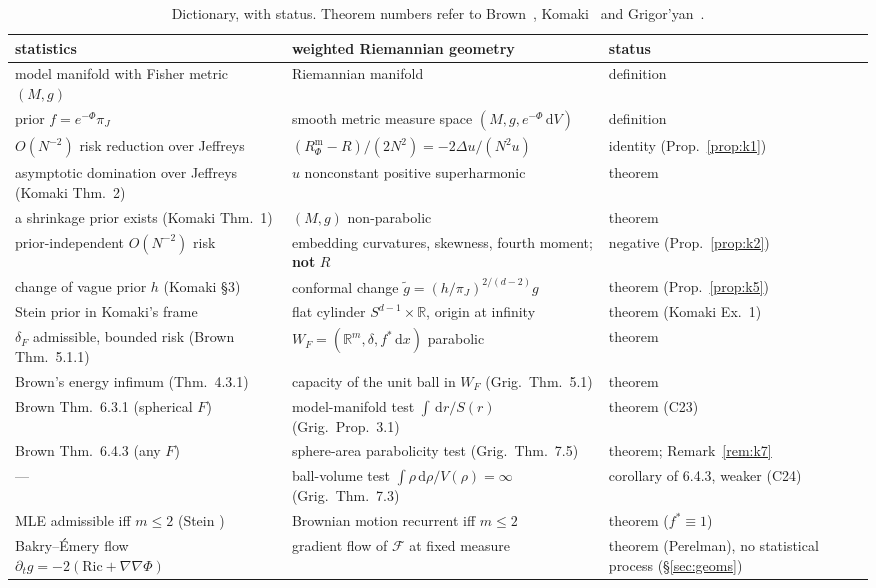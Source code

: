 \documentclass[a4paper,11pt,noarxiv]{quantumarticle}
\newcommand{\R}{\mathbb{R}}
\newcommand{\Rm}{R^{\mathrm m}}
\newcommand{\dd}{\,\mathrm{d}}
\newcommand{\grad}{\nabla}
\theoremstyle{plain}
\theoremstyle{definition}
\theoremstyle{remark}
\begin{document}
\begin{table}[t]
\caption{Dictionary, with status. Theorem numbers refer to
Brown~\cite{brown1971}, Komaki~\cite{komaki2006} and
Grigor'yan~\cite{grigoryan1999}.}
\label{tab:dict}
\small
\begin{tabular}{@{}>{\raggedright\arraybackslash}p{}>{\raggedright\arraybackslash}p{}>{\raggedright\arraybackslash}p{}@{}}
\toprule
statistics & weighted Riemannian geometry & status \\
\midrule
model manifold with Fisher metric $(M,g)$ & Riemannian manifold & definition \cite{amari2000} \\
prior $f=e^{-\Phi}\pi_J$ & smooth metric measure space $(M,g,e^{-\Phi}\dd V)$ & definition \\
$O(N^{-2})$ risk reduction over Jeffreys & $(\Rm_\Phi-R)/(2N^2)=-2\Delta u/(N^2u)$ & identity (Prop.~\ref{prop:k1}) \\
asymptotic domination over Jeffreys (Komaki Thm.\ 2) & $u$ nonconstant positive superharmonic & theorem \\
a shrinkage prior exists (Komaki Thm.\ 1) & $(M,g)$ non-parabolic & theorem \\
prior-independent $O(N^{-2})$ risk & embedding curvatures, skewness, fourth moment; \textbf{not} $R$ & negative (Prop.~\ref{prop:k2}) \\
change of vague prior $h$ (Komaki \S3) & conformal change $\tilde g=(h/\pi_J)^{2/(d-2)}g$ & theorem (Prop.~\ref{prop:k5}) \\
Stein prior in Komaki's frame & flat cylinder $S^{d-1}\times\R$, origin at infinity & theorem (Komaki Ex.\ 1) \\
$\delta_F$ admissible, bounded risk (Brown Thm.\ 5.1.1) & $W_F=(\R^m,\delta,f^*\dd x)$ parabolic & theorem \\
Brown's energy infimum (Thm.\ 4.3.1) & capacity of the unit ball in $W_F$ (Grig.\ Thm.\ 5.1) & theorem \\
Brown Thm.\ 6.3.1 (spherical $F$) & model-manifold test $\int\dd r/S(r)$ (Grig.\ Prop.\ 3.1) & theorem (C23) \\
Brown Thm.\ 6.4.3 (any $F$) & sphere-area parabolicity test (Grig.\ Thm.\ 7.5) & theorem; Remark~\ref{rem:k7} \\
--- & ball-volume test $\int\rho\dd\rho/V(\rho)=\infty$ (Grig.\ Thm.\ 7.3) & corollary of 6.4.3, weaker (C24) \\
MLE admissible iff $m\le2$ (Stein \cite{stein1956}) & Brownian motion recurrent iff $m\le2$ & theorem ($f^*\equiv1$) \\
Bakry--\'Emery flow $\partial_tg=-2(\mathrm{Ric}+\grad\grad\Phi)$ & gradient flow of $\mathcal F$ at fixed measure & theorem (Perelman), no statistical process (\S\ref{sec:geoms}) \\
\bottomrule
\end{tabular}
\end{table}
\end{document}
